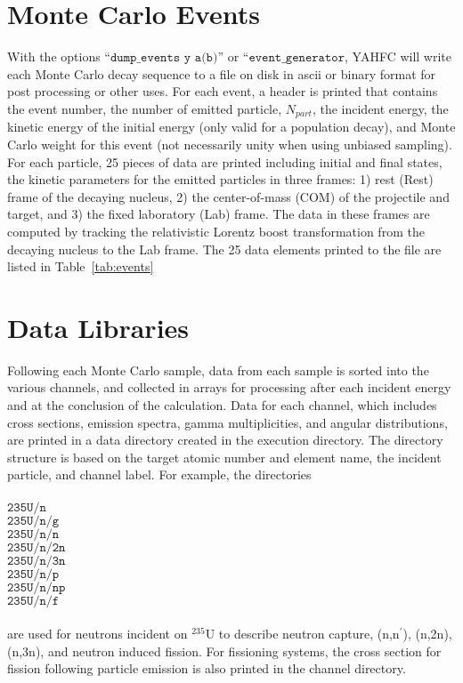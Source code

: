 \documentclass[
10pt,
showpacs,preprintnumbers,footinbib,
amsfonts,amsmath,amssymb,
aps,
prc,twocolumn,groupedaddress,superscriptaddress,
showkeys,
nofootinbib
]{revtex4-1}
\begin{document}
\section{Monte Carlo Events}

With the options ``${\texttt{dump\_events y a(b)}}$'' or ``${\texttt{event\_generator}}$, YAHFC will write each Monte Carlo decay sequence to a file on disk in ascii or binary format for post processing or other uses. For each event, a header is printed that contains the event number, the number of emitted particle, $N_{part}$, the incident energy, the kinetic energy of the initial energy (only valid for a population decay), and Monte Carlo weight for this event (not necessarily unity when using unbiased sampling). For each particle, 25 pieces of data are printed including initial and final states, the kinetic parameters for the emitted particles in three frames: 1) rest (Rest) frame of the decaying nucleus, 2) the center-of-mass (COM) of the projectile and target, and 3) the fixed laboratory (Lab) frame. The data in these frames are computed by tracking the relativistic Lorentz boost transformation from the decaying nucleus to the Lab frame. The 25 data elements printed to the file are listed in Table~\ref{tab:events}

\section{Data Libraries}
\label{sec:Libraries}
Following each Monte Carlo sample, data from each sample is sorted into the various channels, and collected in arrays for processing after each incident energy and at the conclusion of the calculation. Data for each channel, which includes cross sections, emission spectra, gamma multiplicities, and angular distributions, are printed in a data directory created in the execution directory. The directory structure is based on the target atomic number and element name, the incident particle, and channel label. For example, the directories\\
\\
${\texttt{235U/n}}$\\
${\texttt{235U/n/g}}$\\
${\texttt{235U/n/n}}$\\
${\texttt{235U/n/2n}}$\\
${\texttt{235U/n/3n}}$\\
${\texttt{235U/n/p}}$\\
${\texttt{235U/n/np}}$\\
${\texttt{235U/n/f}}$\\
\\
are used for neutrons incident on $^{235}$U to describe neutron capture, (n,n$^\prime$), (n,2n), (n,3n), and neutron induced fission. For fissioning systems, the cross section for fission following particle emission is also printed in the channel directory. 
\end{document}
